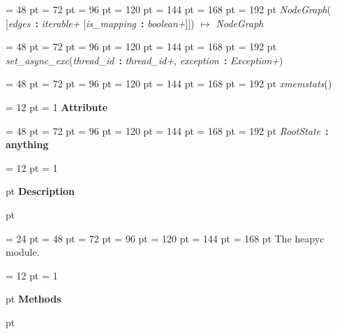 {{{{\par \noindent  \leftskip = 48 pt  \leftmargini = 72 pt  \leftmarginii = 96 pt  \leftmarginiii = 120 pt  \leftmarginiv = 144 pt  \leftmarginv = 168 pt  \leftmarginvi = 192 pt {\large  {\em NodeGraph\/}}( {[}{\em edges\/}~{\bf :}  {\em iterable+\/}  {[}{\em is{\_}mapping\/}~{\bf :}  {\em boolean+\/}]]) \(\mapsto \)  {\em NodeGraph\/}\par}
{\par \noindent  \leftskip = 48 pt  \leftmargini = 72 pt  \leftmarginii = 96 pt  \leftmarginiii = 120 pt  \leftmarginiv = 144 pt  \leftmarginv = 168 pt  \leftmarginvi = 192 pt {\large  {\em set{\_}async{\_}exc\/}}({\em thread{\_}id\/}~{\bf :}  {\em thread{\_}id+\/}, {\em exception\/}~{\bf :}  {\em Exception+\/})\par}
{\par \noindent  \leftskip = 48 pt  \leftmargini = 72 pt  \leftmarginii = 96 pt  \leftmarginiii = 120 pt  \leftmarginiv = 144 pt  \leftmarginv = 168 pt  \leftmarginvi = 192 pt {\large  {\em xmemstats\/}}()\par}
{\par \pagebreak[3.200000] \noindent \hangindent = 12 pt \hangafter = 1 
{\bf {\large {\bf Attribute\/}}\/}\par}
{\par \noindent  \leftskip = 48 pt  \leftmargini = 72 pt  \leftmarginii = 96 pt  \leftmarginiii = 120 pt  \leftmarginiv = 144 pt  \leftmarginv = 168 pt  \leftmarginvi = 192 pt {\large  {\em RootState\/}}~{\bf :} {\bf  anything\/}\par}
\par}
\par}
{\par \pagebreak[3.300000] \noindent \hangindent = 12 pt \hangafter = 1 
{\par \pagebreak[3]  pt \noindent
{\Large {\bf Description\/}}\par {} pt
} \noindent
\par}
{\par \noindent  \leftskip = 24 pt  \leftmargini = 48 pt  \leftmarginii = 72 pt  \leftmarginiii = 96 pt  \leftmarginiv = 120 pt  \leftmarginv = 144 pt  \leftmarginvi = 168 pt  The heapyc module.\par}
{\par \pagebreak[3.300000] \noindent \hangindent = 12 pt \hangafter = 1 
{\par \pagebreak[3]  pt \noindent
{\Large {\bf Methods\/}}\par {} pt
}}}
